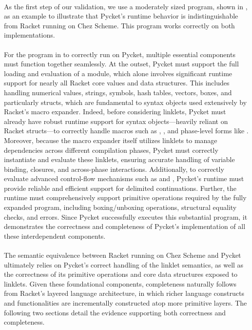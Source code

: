 	\paragraph{}%
		As the first step of our validation, we use a moderately sized program, shown in , as an example to illustrate that Pycket's runtime behavior is indistinguishable from Racket running on Chez Scheme. This program works correctly on both implementations.


	\paragraph{}%
		For the program in  to correctly run on Pycket, multiple essential components must function together seamlessly. At the outset, Pycket must support the full loading and evaluation of a  module, which alone involves significant runtime support for nearly all Racket core values and data structures. This includes handling numerical values, strings, symbols, hash tables, vectors, boxes, and particularly structs, which are fundamental to syntax objects used extensively by Racket’s macro expander. Indeed, before considering linklets, Pycket must already have robust runtime support for syntax objects—heavily reliant on Racket structs—to correctly handle macros such as , , and phase-level forms like . Moreover, because the macro expander itself utilizes linklets to manage dependencies across different compilation phases, Pycket must correctly instantiate and evaluate these linklets, ensuring accurate handling of variable binding, closures, and across-phase interactions. Additionally, to correctly evaluate advanced control-flow mechanisms such as  and , Pycket's runtime must provide reliable and efficient support for delimited continuations. Further, the runtime must comprehensively support primitive operations required by the fully expanded program, including boxing/unboxing operations, structural equality checks, and errors. Since Pycket successfully executes this substantial program, it demonstrates the correctness and completeness of Pycket’s implementation of all these interdependent components.

	\paragraph{}%
		The semantic equivalence between Racket running on Chez Scheme and Pycket ultimately relies on Pycket's correct handling of the linklet semantics, as well as the correctness of its primitive operations and core data structures exposed to linklets. Given these foundational components, completeness naturally follows from Racket’s layered language architecture, in which richer language constructs and functionalities are incrementally constructed atop more primitive layers. The following two sections detail the evidence supporting both correctness and completeness.

